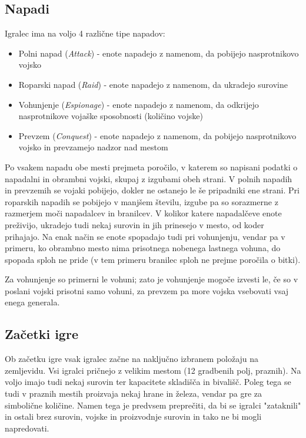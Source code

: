 \documentclass[a4paper, 16pt]{article}
\begin{document}
\subsection{Napadi}

Igralec ima na voljo 4 različne tipe napadov:

\begin{itemize}
    \item Polni napad (\textit{Attack}) - enote napadejo z namenom, da pobijejo nasprotnikovo vojsko
    \item Roparski napad (\textit{Raid}) - enote napadejo z namenom, da ukradejo surovine
    \item Vohunjenje (\textit{Espionage}) - enote napadejo z namenom, da odkrijejo nasprotnikove vojaške sposobnosti (količino vojske)
    \item Prevzem (\textit{Conquest}) - enote napadejo z namenom, da pobijejo nasprotnikovo vojsko in prevzamejo nadzor nad mestom
\end{itemize}

Po vsakem napadu obe mesti prejmeta poročilo, v katerem so napisani podatki o napadalni in obrambni vojski, skupaj z izgubami obeh strani.
V polnih napadih in prevzemih se vojaki pobijejo, dokler ne ostanejo le še pripadniki ene strani. Pri roparskih napadih se pobijejo v manjšem številu, izgube pa so sorazmerne z 
razmerjem moči napadalcev in branilcev. V kolikor katere napadalčeve enote preživijo, ukradejo tudi nekaj surovin in jih prinesejo v mesto, od koder prihajajo.
Na enak način se enote spopadajo tudi pri vohunjenju, vendar pa v primeru, ko obrambno mesto nima prisotnega nobenega lastnega vohuna, do spopada sploh ne pride (v tem primeru branilec sploh ne prejme poročila o bitki).

Za vohunjenje so primerni le vohuni; zato je vohunjenje mogoče izvesti le, če so v poslani vojski prisotni samo vohuni, za 
prevzem pa more vojska vsebovati vsaj enega generala.

\subsection{Začetki igre}

Ob začetku igre vsak igralec začne na naključno izbranem položaju na zemljevidu. Vsi igralci pričnejo z velikim mestom (12 gradbenih polj, praznih). Na voljo imajo tudi nekaj surovin ter 
kapacitete skladišča in bivališč. Poleg tega se tudi v praznih mestih proizvaja nekaj hrane in železa, vendar pa gre za simbolične količine. Namen tega je predvsem preprečiti, da bi se igralci "zataknili" in 
ostali brez surovin, vojske in proizvodnje surovin in tako ne bi mogli napredovati.
\end{document}
